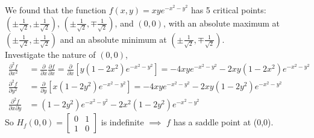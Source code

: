 \begin{example}
    We found that the function $f(x,y) = xye^{-x^2 - y^2}$ has 5 critical points: $\left(\pm \frac{1}{\sqrt{2}}, \pm \frac{1}{\sqrt{2}}\right)$, $\left(\pm \frac{1}{\sqrt{2}}, \mp \frac{1}{\sqrt{2}}\right)$, and $\left(0, 0\right)$, with an absolute maximum at $\left(\pm \frac{1}{\sqrt{2}}, \pm \frac{1}{\sqrt{2}}\right)$ and an absolute minimum at $\left(\pm \frac{1}{\sqrt{2}}, \mp \frac{1}{\sqrt{2}}\right)$. \\
    Investigate the nature of $(0,0)$,
    \begin{align*}
        \frac{\partial^2 f}{\partial x^2} &= \frac{\partial}{\partial x} \frac{\partial f}{\partial x} = \frac{\partial}{\partial x} \left[y(1 - 2x^2)e^{-x^2 - y^2}\right] = -4xye^{-x^2 - y^2} - 2xy(1-2x^2)e^{-x^2 - y^2} \\
        \frac{\partial^2 f}{\partial y^2} &= \frac{\partial}{\partial y} \left[x(1 - 2y^2)e^{-x^2 - y^2}\right] = -4xye^{-x^2 - y^2} - 2xy(1-2y^2)e^{-x^2 - y^2} \\
        \frac{\partial^2 f}{\partial x \partial y} &= (1 - 2y^2)e^{-x^2 - y^2} - 2x^2(1 - 2y^2)e^{-x^2 - y^2}
    \end{align*}
    So $H_f(0,0) = \begin{bmatrix} 0 & 1 \\ 1 & 0 \end{bmatrix}$ is indefinite $\implies$ $f$ has a saddle point at (0,0).
\end{example}

